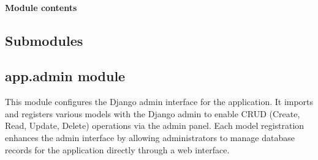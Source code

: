 \documentclass[letterpaper,10pt,english]{sphinxmanual}
\begin{document}
\paragraph{Module contents}
\label{\detokenize{app.migrations:module-app.migrations}}\label{\detokenize{app.migrations:module-contents}}

\subsection{Submodules}
\label{\detokenize{app:submodules}}

\subsection{app.admin module}
\label{\detokenize{app:module-app.admin}}\label{\detokenize{app:app-admin-module}}
\sphinxAtStartPar
This module configures the Django admin interface for the application. It imports and registers various models with the Django admin to enable CRUD (Create, Read, Update, Delete) operations via the admin panel. Each model registration enhances the admin interface by allowing administrators to manage database records for the application directly through a web interface.
\end{document}
